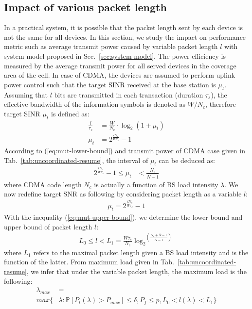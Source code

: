 \subsection{Impact of various packet length}
In a practical system, it is possible that the packet length sent by each device is not the same for all devices. In this section, we study the impact on performance metric such as average transmit power caused by variable packet length $l$ with system model proposed in Sec.~\ref{sec:system-model}. The power efficiency is measured by the average transmit power for all served devices in the coverage area of the cell. In case of CDMA, the devices are assumed to perform uplink power control such that the target SINR received at the base station is $\mu_t$. Assuming that $l$ bits are transmitted in each transaction (duration $\tau_s$), the effective bandwidth of the information symbols is denoted as $W/N_c$, therefore target SINR $\mu_t$ is defined as:
\begin{align}
\frac{l}{\tau_s} &= \frac{W}{N_c} \cdot \log_2 \left( 1+ \mu_t\right)  \nonumber \\
\mu_t &= 2^{\frac{lN_c}{W\tau_s}}-1 \label{eq:mut-lower-bound}
\end{align}
According to (\ref{eq:mut-lower-bound}) and transmit power of CDMA case given in Tab.~\ref{tab:uncoordinated-resume}, the interval of $\mu_t$ can be deduced as: 
\begin{align}
2^{\frac{lN_c}{W\tau_s}}-1 \leq \mu_t &< \frac{N_c}{\overline{N}-1} \label{eq:mut-upper-bound}
\end{align}
where CDMA code length $N_c$ is actually a function of BS load intensity $\lambda$. We now redefine target SNR as following by considering packet length as a variable $l$:
\begin{align}
\mu_t = 2^{\frac{l N_c}{W\tau_s}}-1
\end{align} 
With the inequality (\ref{eq:mut-upper-bound}), we determine the lower bound and upper bound of packet length $l$:
\begin{align}
L_{0} \leq l <L_{1} = \frac{W\tau_s}{N_c} {\log_2}^{\left( \frac{N_c +\overline{N} -1}{\overline{N}-1}\right) } \label{ieq:packet-length-interval}
\end{align} 
where $L_{1}$ refers to the maximal packet length given a BS load intensity and is the function of the latter. From maximum load given in Tab.~\ref{tab:uncoordinated-resume}, we infer that under the variable packet length, the maximum load is the following:
\begin{align}
	\lambda_{max} &= \nonumber\\ max\{ 
	&\lambda: \mathbb{P}\left[P_t(\lambda) > P_{max}\right] \leq \delta, P_f \leq p, L_{0} < l\left(\lambda \right) < L_{1} \}
\end{align} 
